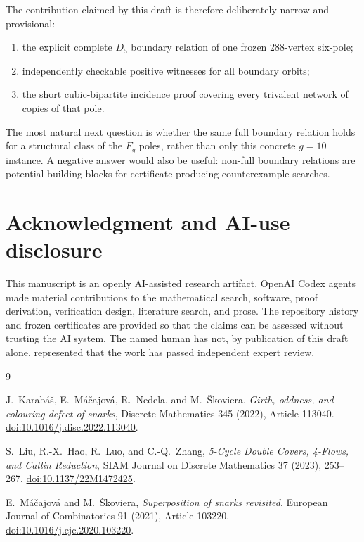 \documentclass[11pt]{article}
\theoremstyle{definition}
\theoremstyle{remark}
\newcommand{\Dfive}{D_5}
\numberwithin{equation}{section}
\begin{document}
The contribution claimed by this draft is therefore deliberately narrow
and provisional:
\begin{enumerate}
\item the explicit complete \(\Dfive\) boundary relation of one frozen
      288-vertex six-pole;
\item independently checkable positive witnesses for all boundary orbits;
\item the short cubic-bipartite incidence proof covering every trivalent
      network of copies of that pole.
\end{enumerate}
The most natural next question is whether the same full boundary relation
holds for a structural class of the \(F_g\) poles, rather than only this
concrete \(g=10\) instance.  A negative answer would also be useful:
non-full boundary relations are potential building blocks for
certificate-producing counterexample searches.

\section*{Acknowledgment and AI-use disclosure}

This manuscript is an openly AI-assisted research artifact.  OpenAI Codex
agents made material contributions to the mathematical search, software,
proof derivation, verification design, literature search, and prose.  The
repository history and frozen certificates are provided so that the claims
can be assessed without trusting the AI system.  The named human has not,
by publication of this draft alone, represented that the work has passed
independent expert review.

\begin{thebibliography}{9}

J.~Karab\'a\v{s}, E.~M\'a\v{c}ajov\'a, R.~Nedela, and M.~\v{S}koviera,
\emph{Girth, oddness, and colouring defect of snarks},
Discrete Mathematics 345 (2022), Article 113040.
\href{https://doi.org/10.1016/j.disc.2022.113040}
{doi:10.1016/j.disc.2022.113040}.

S.~Liu, R.-X.~Hao, R.~Luo, and C.-Q.~Zhang,
\emph{5-Cycle Double Covers, 4-Flows, and Catlin Reduction},
SIAM Journal on Discrete Mathematics 37 (2023), 253--267.
\href{https://doi.org/10.1137/22M1472425}
{doi:10.1137/22M1472425}.

E.~M\'a\v{c}ajov\'a and M.~\v{S}koviera,
\emph{Superposition of snarks revisited},
European Journal of Combinatorics 91 (2021), Article 103220.
\href{https://doi.org/10.1016/j.ejc.2020.103220}
{doi:10.1016/j.ejc.2020.103220}.

\end{thebibliography}
\end{document}
